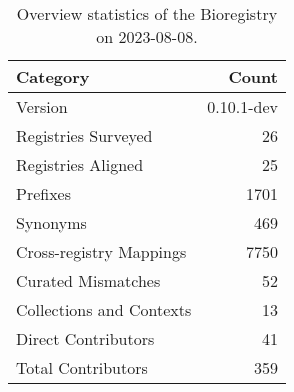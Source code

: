 \begin{table}
\caption{Overview statistics of the Bioregistry on 2023-08-08.}
\label{tab:bioregistry-summary}
\begin{tabular}{lr}
\toprule
Category & Count \\
\midrule
Version & 0.10.1-dev \\
Registries Surveyed & 26 \\
Registries Aligned & 25 \\
Prefixes & 1701 \\
Synonyms & 469 \\
Cross-registry Mappings & 7750 \\
Curated Mismatches & 52 \\
Collections and Contexts & 13 \\
Direct Contributors & 41 \\
Total Contributors & 359 \\
\bottomrule
\end{tabular}
\end{table}
